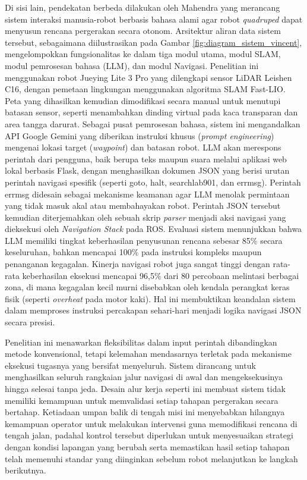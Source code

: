 Di sisi lain, pendekatan berbeda dilakukan oleh Mahendra \cite{Mahendra2024} yang merancang sistem interaksi manusia-robot berbasis bahasa alami agar robot \textit{quadruped} dapat menyusun rencana pergerakan secara otonom. Arsitektur aliran data sistem tersebut, sebagaimana diilustrasikan pada Gambar \ref{fig:diagram_sistem_vincent}, mengelompokkan fungsionalitas ke dalam tiga modul utama, modul SLAM, modul pemrosesan bahasa (LLM), dan modul Navigasi. Penelitian ini menggunakan robot Jueying Lite 3 Pro yang dilengkapi sensor LiDAR Leishen C16, dengan pemetaan lingkungan menggunakan algoritma SLAM Fast-LIO. Peta yang dihasilkan kemudian dimodifikasi secara manual untuk menutupi batasan sensor, seperti menambahkan dinding virtual pada kaca transparan dan area tangga darurat. Sebagai pusat pemrosesan bahasa, sistem ini mengandalkan API Google Gemini yang diberikan instruksi khusus (\textit{prompt engineering}) mengenai lokasi target (\textit{waypoint}) dan batasan robot. LLM akan merespons perintah dari pengguna, baik berupa teks maupun suara melalui aplikasi web lokal berbasis Flask, dengan menghasilkan dokumen JSON yang berisi urutan perintah navigasi spesifik (seperti goto, halt, searchlab901, dan errmsg). Perintah errmsg didesain sebagai mekanisme keamanan agar LLM menolak permintaan yang tidak masuk akal atau membahayakan robot. Perintah JSON tersebut kemudian diterjemahkan oleh sebuah skrip \textit{parser} menjadi aksi navigasi yang dieksekusi oleh \textit{Navigation Stack} pada ROS. Evaluasi sistem menunjukkan bahwa LLM memiliki tingkat keberhasilan penyusunan rencana sebesar 85\% secara keseluruhan, bahkan mencapai 100\% pada instruksi kompleks maupun penanganan kegagalan. Kinerja navigasi robot juga sangat tinggi dengan rata-rata keberhasilan eksekusi mencapai 96,5\% dari 80 percobaan melintasi berbagai zona, di mana kegagalan kecil murni disebabkan oleh kendala perangkat keras fisik (seperti \textit{overheat} pada motor kaki). Hal ini membuktikan keandalan sistem dalam memproses instruksi percakapan sehari-hari menjadi logika navigasi JSON secara presisi.

Penelitian ini menawarkan fleksibilitas dalam input perintah dibandingkan metode konvensional, tetapi kelemahan mendasarnya terletak pada mekanisme eksekusi tugasnya yang bersifat menyeluruh. Sistem dirancang untuk menghasilkan seluruh rangkaian jalur navigasi di awal dan mengeksekusinya hingga selesai tanpa jeda. Desain alur kerja seperti ini membuat sistem tidak memiliki kemampuan untuk memvalidasi setiap tahapan pergerakan secara bertahap. Ketiadaan umpan balik di tengah misi ini menyebabkan hilangnya kemampuan operator untuk melakukan intervensi guna memodifikasi rencana di tengah jalan, padahal kontrol tersebut diperlukan untuk menyesuaikan strategi dengan kondisi lapangan yang berubah serta memastikan hasil setiap tahapan telah memenuhi standar yang diinginkan sebelum robot melanjutkan ke langkah berikutnya.

